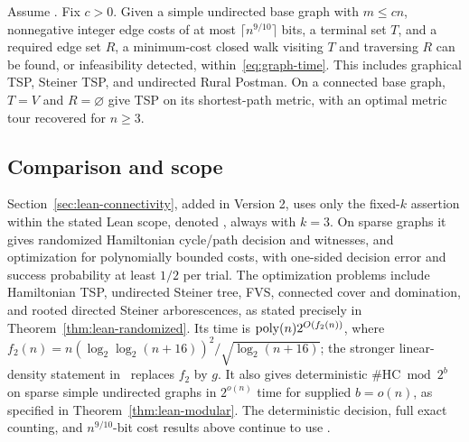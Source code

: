 \begin{theorem}
\label{thm:routing}
Assume \HTC. Fix $c>0$. Given a simple undirected base graph with
$m\le cn$, nonnegative integer edge costs of at most
$\lceil n^{9/10}\rceil$ bits, a terminal set $T$, and a required edge
set $R$, a minimum-cost closed walk visiting $T$ and traversing $R$
can be found, or infeasibility detected, within~\eqref{eq:graph-time}.
This includes graphical TSP, Steiner TSP, and undirected Rural Postman.
On a connected base graph, $T=V$ and $R=\varnothing$ give TSP on its
shortest-path metric, with an optimal metric tour recovered for $n\ge3$.
\end{theorem}

\subsection{Comparison and scope}

Section~\ref{sec:lean-connectivity}, added in Version 2, uses only the
fixed-$k$ assertion within the stated Lean scope, denoted \HLean,
always with $k=3$. On sparse graphs it gives randomized Hamiltonian
cycle/path decision and witnesses, and optimization for polynomially
bounded costs, with one-sided decision error and success probability at
least $1/2$ per trial. The optimization problems include Hamiltonian
TSP, undirected Steiner tree, FVS, connected cover and domination,
and rooted directed Steiner arborescences, as stated precisely in
Theorem~\ref{thm:lean-randomized}. Its time is
$\operatorname{poly}(n)2^{O(f_2(n))}$, where
$f_2(n)=n(\log_2\log_2(n+16))^2/\sqrt{\log_2(n+16)}$;
the stronger linear-density statement in \HBB\ replaces $f_2$ by $g$.
It also gives deterministic $\#\mathrm{HC}\bmod2^b$ on sparse simple
undirected graphs in $2^{o(n)}$ time for supplied $b=o(n)$, as specified in
Theorem~\ref{thm:lean-modular}. The deterministic decision, full exact
counting, and $n^{9/10}$-bit cost results above continue to use \HTC.

